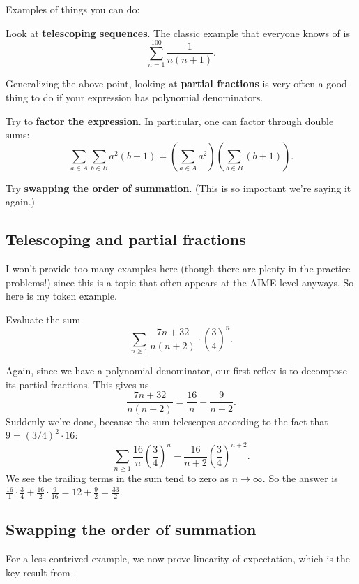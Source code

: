 \documentclass[11pt]{scrartcl}
\begin{document}
Examples of things you can do:
\begin{itemize}
	\ii Look at \textbf{telescoping sequences}.
	The classic example that everyone knows of is
	\[ \sum_{n=1}^{100} \frac{1}{n(n+1)}. \]

	\ii Generalizing the above point, looking at \textbf{partial fractions}
	is very often a good thing to do if your expression has polynomial denominators.

	\ii Try to \textbf{factor the expression}.
	In particular, one can factor through double sums:
	\[ \sum_{a \in A} \sum_{b \in B} a^2(b+1)
		= \left( \sum_{a \in A} a^2 \right)
		\left( \sum_{b \in B} (b+1) \right). \]

	\ii Try \textbf{swapping the order of summation}.
	(This is so important we're saying it again.)
\end{itemize}

\subsection{Telescoping and partial fractions}
I won't provide too many examples here
(though there are plenty in the practice problems!)
since this is a topic that often appears at the AIME level anyways.
So here is my token example.
\begin{example}
	[Stanford 2011]
	Evaluate the sum \[ \sum_{n \ge 1} \frac{7n+32}{n(n+2)} \cdot \left( \frac 34 \right)^n. \]
\end{example}
\begin{soln}
	Again, since we have a polynomial denominator,
	our first reflex is to decompose its partial fractions. This gives us
	\[ \frac{7n+32}{n(n+2)} = \frac{16}{n} - \frac{9}{n+2}. \]
	Suddenly we're done, because the sum telescopes
	according to the fact that $9 = (3/4)^2 \cdot 16$:
	\[ \sum_{n \ge 1} \frac{16}{n} \left( \frac 34 \right)^n
		- \frac{16}{n+2} \left( \frac 34 \right)^{n+2} . \]
	We see the trailing terms in the sum tend to zero as $n \to \infty$.
	So the answer is $\frac{16}{1} \cdot \frac34 + \frac{16}{2} \cdot \frac{9}{16}
	= 12 + \frac{9}{2} = \frac{33}{2}$.
\end{soln}

\subsection{Swapping the order of summation}
For a less contrived example, we now prove linearity of expectation,
which is the key result from \cite{ref:EV}.
\end{document}
